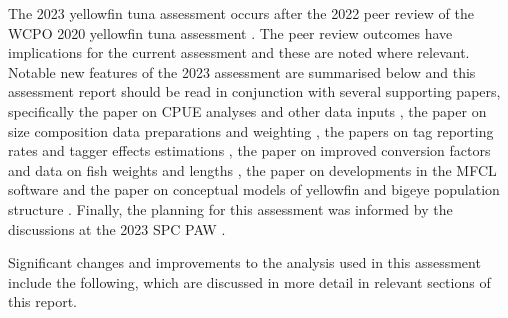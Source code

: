 The 2023 yellowfin tuna assessment occurs after the 2022 peer review of the WCPO 2020 yellowfin tuna assessment \citep{punt_independent_2023}. The peer review outcomes have implications for the current assessment and these are noted where relevant. Notable new features of the 2023 assessment are summarised below and this assessment report should be read in conjunction with several supporting papers, specifically the paper on CPUE analyses and other data inputs \citep{teears_cpue_2023}, the paper on size composition data preparations and weighting \citep{peatman_analysis_2023}, the papers on tag reporting rates and tagger effects estimations \citep{peatman_analysis_2023-2,peatman_analysis_2023-1}, the paper on improved conversion factors and data on fish weights and lengths \citep{macdonald_project_2023-1}, the paper on developments in the MFCL software \citep{davies_developments_2023} and the paper on conceptual models of yellowfin  and bigeye population structure \citep{hamer_review_2023}. Finally, the planning for this assessment was informed by the discussions at the 2023 SPC PAW \citep{hamer_report_2023}.

Significant changes and improvements to the analysis used in this assessment include the following, which are discussed in more detail in relevant sections of this report.

